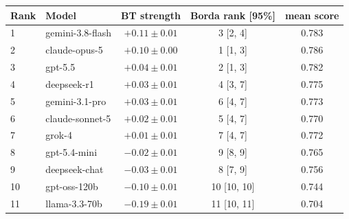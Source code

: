 \begin{tabular}{llccc}
\toprule
Rank & Model & BT strength & Borda rank [95\%] & mean score \\
\midrule
1 & gemini-3.8-flash & $+0.11 \pm 0.01$ & 3 [2, 4] & 0.783 \\
2 & claude-opus-5 & $+0.10 \pm 0.00$ & 1 [1, 3] & 0.786 \\
3 & gpt-5.5 & $+0.04 \pm 0.01$ & 2 [1, 3] & 0.782 \\
4 & deepseek-r1 & $+0.03 \pm 0.01$ & 4 [3, 7] & 0.775 \\
5 & gemini-3.1-pro & $+0.03 \pm 0.01$ & 6 [4, 7] & 0.773 \\
6 & claude-sonnet-5 & $+0.02 \pm 0.01$ & 5 [4, 7] & 0.770 \\
7 & grok-4 & $+0.01 \pm 0.01$ & 7 [4, 7] & 0.772 \\
8 & gpt-5.4-mini & $-0.02 \pm 0.01$ & 9 [8, 9] & 0.765 \\
9 & deepseek-chat & $-0.03 \pm 0.01$ & 8 [7, 9] & 0.756 \\
10 & gpt-oss-120b & $-0.10 \pm 0.01$ & 10 [10, 10] & 0.744 \\
11 & llama-3.3-70b & $-0.19 \pm 0.01$ & 11 [10, 11] & 0.704 \\
\bottomrule
\end{tabular}
